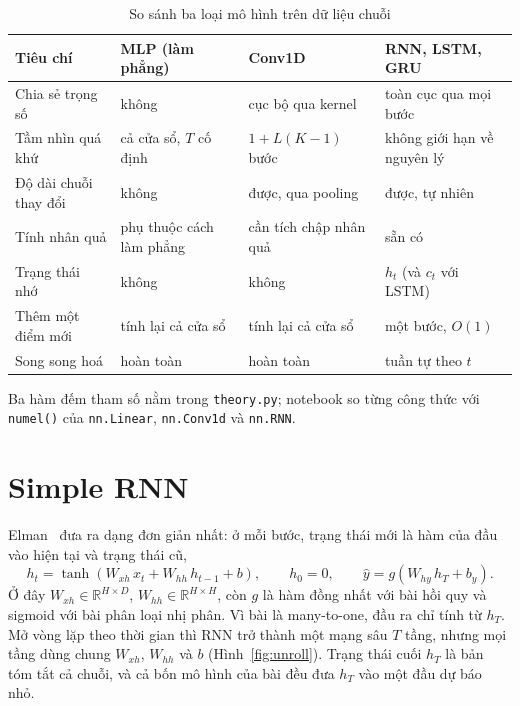 \begin{table}[H]
  \centering\small
  \caption{So sánh ba loại mô hình trên dữ liệu chuỗi}
  \label{tab:mlp-rnn-full}
  \begin{tabular}{L{3.4cm}L{3.5cm}L{3.5cm}L{3.8cm}}
    \toprule
    Tiêu chí & MLP (làm phẳng) & Conv1D & RNN, LSTM, GRU \\
    \midrule
    Chia sẻ trọng số & không & cục bộ qua kernel & toàn cục qua mọi bước \\
    Tầm nhìn quá khứ & cả cửa sổ, $T$ cố định & $1 + L(K-1)$ bước & không giới hạn về nguyên lý \\
    Độ dài chuỗi thay đổi & không & được, qua pooling & được, tự nhiên \\
    Tính nhân quả & phụ thuộc cách làm phẳng & cần tích chập nhân quả & sẵn có \\
    Trạng thái nhớ & không & không & $h_t$ (và $c_t$ với LSTM) \\
    Thêm một điểm mới & tính lại cả cửa sổ & tính lại cả cửa sổ & một bước, $O(1)$ \\
    Song song hoá & hoàn toàn & hoàn toàn & tuần tự theo $t$ \\
    \bottomrule
  \end{tabular}
\end{table}

Ba hàm đếm tham số nằm trong \texttt{theory.py}; notebook so từng công thức với \texttt{numel()} của
\texttt{nn.Linear}, \texttt{nn.Conv1d} và \texttt{nn.RNN}.


\section{Simple RNN}

Elman~\cite{elman1990} đưa ra dạng đơn giản nhất: ở mỗi bước, trạng thái mới là hàm của đầu vào hiện tại và trạng
thái cũ,
\begin{equation}
  h_t = \tanh\left(W_{xh}\, x_t + W_{hh}\, h_{t-1} + b\right), \qquad h_0 = 0, \qquad
  \hat y = g\left(W_{hy}\, h_T + b_y\right).
  \label{eq:rnn}
\end{equation}
Ở đây $W_{xh} \in \mathbb{R}^{H \times D}$, $W_{hh} \in \mathbb{R}^{H \times H}$, còn $g$ là hàm đồng nhất với bài hồi
quy và sigmoid với bài phân loại nhị phân. Vì bài là many-to-one, đầu ra chỉ tính từ $h_T$.
Mở vòng lặp theo thời gian thì RNN trở thành một mạng sâu $T$ tầng, nhưng mọi tầng dùng chung $W_{xh}$, $W_{hh}$ và
$b$ (Hình~\ref{fig:unroll}). Trạng thái cuối $h_T$ là bản tóm tắt cả chuỗi, và cả bốn mô hình của bài đều đưa
$h_T$ vào một đầu dự báo nhỏ.

